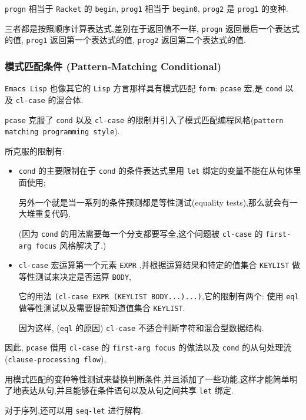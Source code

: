 \documentclass[11pt]{article}
\begin{document}
\texttt{progn} 相当于 \texttt{Racket} 的 \texttt{begin}, \texttt{prog1} 相当于 \texttt{begin0}, \texttt{prog2} 是 \texttt{prog1} 的变种.

三者都是按照顺序计算表达式,差别在于返回值不一样, \texttt{progn} 返回最后一个表达式的值, \texttt{prog1} 返回第一个表达式的值, \texttt{prog2} 返回第二个表达式的值.


\subsubsection{模式匹配条件 (Pattern-Matching Conditional)}
\label{sec:org9ad25b0}

\texttt{Emacs Lisp} 也像其它的 \texttt{Lisp} 方言那样具有模式匹配 \texttt{form}: \texttt{pcase} 宏,是 \texttt{cond} 以及 \texttt{cl-case} 的混合体.

\texttt{pcase} 克服了 \texttt{cond} 以及 \texttt{cl-case} 的限制并引入了模式匹配编程风格(\texttt{pattern matching programming style}).

所克服的限制有:

\begin{itemize}
\item \texttt{cond} 的主要限制在于 \texttt{cond} 的条件表达式里用 \texttt{let} 绑定的变量不能在从句体里面使用;

另外一个就是当一系列的条件预测都是等性测试(equality tests),那么就会有一大堆重复代码,

(因为 \texttt{cond} 的用法需要每一个分支都要写全,这个问题被 \texttt{cl-case} 的 \texttt{first-arg focus} 风格解决了.)

\item \texttt{cl-case} 宏运算第一个元素 \texttt{EXPR} ,并根据运算结果和特定的值集合 \texttt{KEYLIST} 做等性测试来决定是否运算 \texttt{BODY},

它的用法 \texttt{(cl-case EXPR (KEYLIST BODY...)...)},它的限制有两个: 使用 \texttt{eql} 做等性测试以及需要提前知道值集合 \texttt{KEYLIST}.

因为这样, (\texttt{eql} 的原因) \texttt{cl-case} 不适合判断字符和混合型数据结构.
\end{itemize}

因此, \texttt{pcase} 借用 \texttt{cl-case} 的 \texttt{first-arg focus} 的做法以及 \texttt{cond} 的从句处理流(\texttt{clause-processing flow}),

用模式匹配的变种等性测试来替换判断条件,并且添加了一些功能,这样才能简单明了地表达从句,并且能够在条件语句以及从句之间共享 \texttt{let} 绑定.

对于序列,还可以用 \texttt{seq-let} 进行解构.
\end{document}
